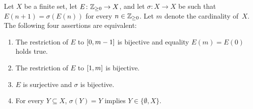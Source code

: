 
\begin{theorem} \label{thm:cyclic-iteration}
  Let $X$ be a finite set,
  let $E\colon \mathbb{Z}_{\ge 0} \to X$, and
  let $\sigma\colon X \to X$ be such that
  $E(n + 1) = \sigma(E(n))$ for every $n \in \mathbb{Z}_{\ge 0}$.
  Let $m$ denote the cardinality of~$X$.
  The following four assertions are equivalent:
  \begin{enumerate}
\item \label{ass:cyclic-iteration:0-m}
  The restriction of $E$ to $\left[ 0, m - 1 \right]$ is bijective and equality $E(m) = E(0)$ holds true.
\item \label{ass:cyclic-iteration:1-m}
  The restriction of $E$ to $\left[ 1, m \right]$ is bijective.
\item \label{ass:cyclic-iteration:surj-bij}
  $E$ is surjective and $\sigma$ is bijective.
\item \label{ass:cyclic-iteration:cycl}
  For every $Y \subseteq X$,
  $\sigma(Y) = Y$ implies $Y \in \{ \emptyset, X \}$. 
  \end{enumerate}
\end{theorem}

